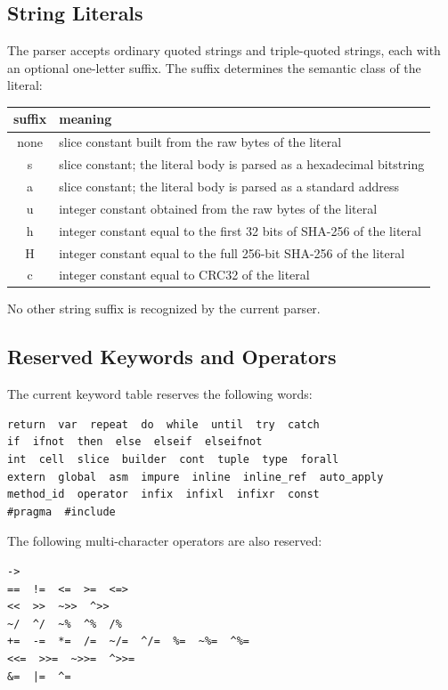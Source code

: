 \documentclass[12pt,oneside]{article}
\begin{document}
\subsection{String Literals}
The parser accepts ordinary quoted strings and triple-quoted strings, each with
an optional one-letter suffix. The suffix determines the semantic class of the
literal:

\begin{center}
\begin{tabular}{|>{\ttfamily}c|m{}|}
\hline
suffix & meaning \\ \hline
none & slice constant built from the raw bytes of the literal \\ \hline
s & slice constant; the literal body is parsed as a hexadecimal bitstring \\ \hline
a & slice constant; the literal body is parsed as a standard address \\ \hline
u & integer constant obtained from the raw bytes of the literal \\ \hline
h & integer constant equal to the first 32 bits of SHA-256 of the literal \\ \hline
H & integer constant equal to the full 256-bit SHA-256 of the literal \\ \hline
c & integer constant equal to CRC32 of the literal \\ \hline
\end{tabular}
\end{center}

No other string suffix is recognized by the current parser.

\subsection{Reserved Keywords and Operators}
The current keyword table reserves the following words:

\begin{verbatim}
return  var  repeat  do  while  until  try  catch
if  ifnot  then  else  elseif  elseifnot
int  cell  slice  builder  cont  tuple  type  forall
extern  global  asm  impure  inline  inline_ref  auto_apply
method_id  operator  infix  infixl  infixr  const
#pragma  #include
\end{verbatim}

The following multi-character operators are also reserved:

\begin{verbatim}
->
==  !=  <=  >=  <=>
<<  >>  ~>>  ^>>
~/  ^/  ~%  ^%  /%
+=  -=  *=  /=  ~/=  ^/=  %=  ~%=  ^%=
<<=  >>=  ~>>=  ^>>=
&=  |=  ^=
\end{verbatim}
\end{document}
